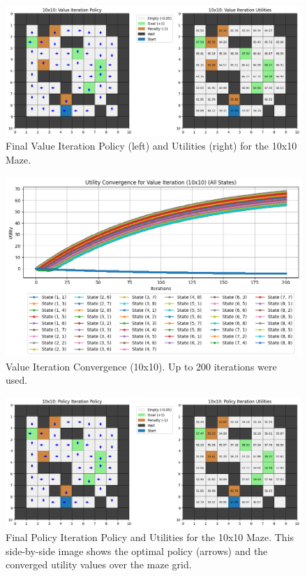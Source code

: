 \documentclass[11pt]{article}
\begin{document}
\begin{figure}[H]
    \centering
    \includegraphics[width=\textwidth]{10x10_value_iteration.png}
    \caption{Final Value Iteration Policy (left) and Utilities (right) for the 10x10 Maze.}
    \label{fig:10x10_vi_side_by_side}
\end{figure}

\begin{figure}[H]
    \centering
    \includegraphics[width=\textwidth]{10x10_value_iteration_convergence.png}
    \caption{Value Iteration Convergence (10x10). Up to 200 iterations were used.}
    \label{fig:10x10_vi_conv}
\end{figure}

\begin{figure}[H]
    \centering
    \includegraphics[width=\textwidth]{10x10_policy_iteration.png}
    \caption{Final Policy Iteration Policy and Utilities for the 10x10 Maze. This side-by-side image shows the optimal policy (arrows) and the converged utility values over the maze grid.}
    \label{fig:10x10_pi_side_by_side}
\end{figure}
\end{document}

